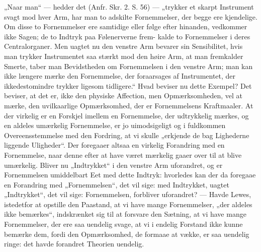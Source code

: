 \documentclass[12pt,a4paper]{book}
\begin{document}
„Naar man“ --- hedder det (Anfr. Skr. 2. S. 56) --- „trykker et skarpt
Instrument svagt mod hver Arm, har man to adskilte Fornemmelser, der begge ere
kjendelige. Om disse to Fornemmelser ere samtidige eller følge efter hinanden,
vedkommer ikke Sagen; de to Indtryk paa Følenerverne frem-
\setcounter{footnote}{0}
kalde to Fornemmelser i deres Centralorganer. Men uagtet nu den venstre Arm
bevarer sin Sensibilitet, hvis man trykker Instrumentet saa stærkt mod den høire
Arm, at man fremkalder Smerte, taber man Bevidstheden om Fornemmelsen i den
venstre Arm; man kan ikke længere mærke den Fornemmelse, der foraarsages af
Instrumentet, der ikkedestomindre trykker ligesom tidligere.“ Hvad beviser nu
dette Exempel? Det beviser, at det er, ikke den physiske Affection, men
Opmærksomheden, vel at mærke, den uvilkaarlige Opmærksomhed, der er
Fornemmelsens Kraftmaaler. At der virkelig er en Forskjel imellem en
Fornemmelse, der udtrykkelig mærkes, og en aldeles umærkelig Fornemmelse, er jo
uimodsigeligt og i fuldkommen Overeensstemmelse med den Fordring, at vi skulle
„erkjende de bag Lighederne liggende Uligheder“. Der foregaaer altsaa en
virkelig Forandring med en Fornemmelse, naar denne efter at have været mærkelig
gaaer over til at blive umærkelig. Bliver nu „Indtrykket“ i den venstre Arm
uforandret, og er Fornemmelsen umiddelbart Eet med dette Indtryk: hvorledes kan
der da foregaae en Forandring med „Fornemmelsen“, det vil sige: med Indtrykket,
uagtet „Indtrykket“, det vil sige: Fornemmelsen, forbliver uforandret? --- Havde
Lewes, istedetfor at opstille den Paastand, at vi have mange Fornemmelser, „der
aldeles ikke bemærkes“, indskrænket sig til at forsvare den Sætning, at vi have
mange Fornemmelser, der ere saa uendelig svage, at vi i endelig Forstand ikke
kunne bemærke dem, fordi den Opmærksomhed, de formaae at vække, er saa uendelig
ringe: det havde forandret Theorien uendelig.
\end{document}
